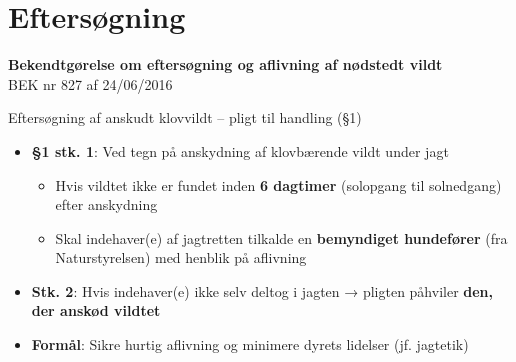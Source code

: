 


\section{Eftersøgning}

\begin{frame}
  \vspace{3em}
  \begin{center}
    {\LARGE \textbf{Bekendtgørelse om eftersøgning og aflivning af nødstedt vildt}} \\
    \vspace{1em}
    BEK nr 827 af 24/06/2016
  \end{center}
\end{frame}

\begin{frame}{Eftersøgning af anskudt klovvildt – pligt til handling (§1)}
    \begin{itemize}
        \item \textbf{§1 stk. 1}: Ved tegn på anskydning af klovbærende vildt under jagt
          \begin{itemize}
            \item Hvis vildtet ikke er fundet inden \textbf{6 dagtimer} (solopgang til solnedgang) efter anskydning
            \item Skal indehaver(e) af jagtretten tilkalde en \textbf{bemyndiget hundefører} (fra Naturstyrelsen) med henblik på aflivning
          \end{itemize}
        \item \textbf{Stk. 2}: Hvis indehaver(e) ikke selv deltog i jagten → pligten påhviler \textbf{den, der anskød vildtet}
        \item \textbf{Formål}: Sikre hurtig aflivning og minimere dyrets lidelser (jf. jagtetik)
    \end{itemize}
\end{frame}

